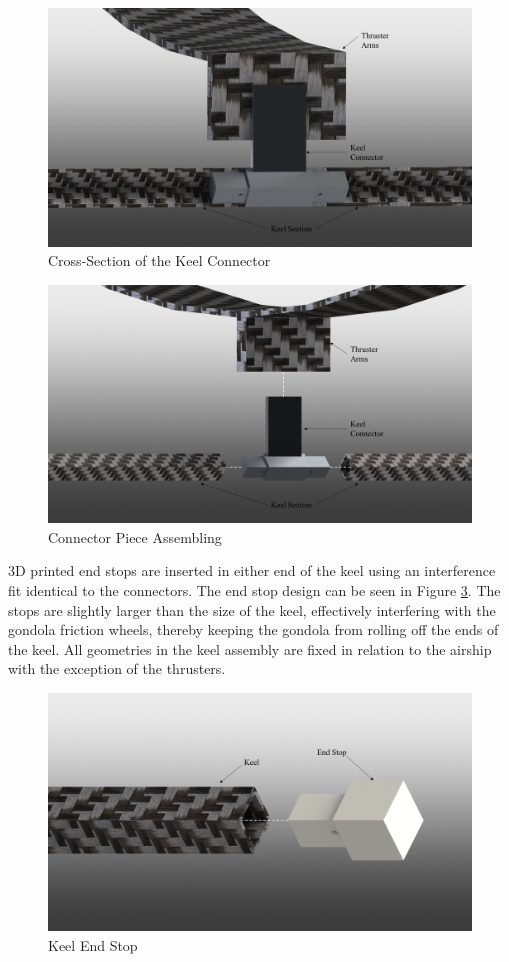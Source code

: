 \documentclass[../main.tex]{subfiles}
\begin{document}
\begin{figure}[H]
	\centering
	\includegraphics[width=.9\linewidth]{img/design/keel/thrusterArmConnectorCrossSection.png}
	\caption{Cross-Section of the Keel Connector}
	\label{fig:thrusterArmConnectorCrossSection}
\end{figure}
\begin{figure}[H]
	\centering
	\includegraphics[width=.9\linewidth]{img/design/keel/thrusterArmConnectorPiece.png}
	\caption{Connector Piece Assembling}
	\label{fig:thrusterArmConnectorPiece}
\end{figure}

 3D printed end stops are inserted in either end of the keel using an interference fit identical to the connectors. The end stop design can be seen in Figure \ref{fig:keelEndCap}. The stops are slightly larger than the size of the keel, effectively interfering with the gondola friction wheels, thereby keeping the gondola from rolling off the ends of the keel. All geometries in the keel assembly are fixed in relation to the airship with the exception of the thrusters.

\begin{figure}[H]
	\centering
	\includegraphics[width=.8\linewidth]{img/design/keel/keelEndCap.png}
	\caption{Keel End Stop}
	\label{fig:keelEndCap}
\end{figure}
\end{document}

